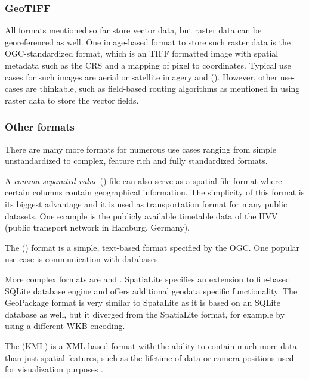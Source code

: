 		\subsubsection{GeoTIFF}
		
			All formats mentioned so far store vector data, but raster data can be georeferenced as well.
			One image-based format to store such raster data is the OGC-standardized  format\cite{ogc-geotiff}, which is an TIFF formatted image with spatial metadata such as the CRS and a mapping of pixel to coordinates.
			Typical use cases for such images are aerial or satellite imagery and  ().
			However, other use-cases are thinkable, such as field-based routing algorithms as mentioned in  using raster data to store the vector fields.
		
		\subsubsection{Other formats}
		\label{subsubsec:other-formats}
		
			There are many more formats for numerous use cases ranging from simple unstandardized to complex, feature rich and fully standardized formats.
			
			A \emph{comma-separated value} () file can also serve as a spatial file format where certain columns contain geographical information.
			The simplicity of this format is its biggest advantage and it is used as transportation format for many public datasets.
			One example is the publicly available timetable data of the HVV (public transport network in Hamburg, Germany)\cite{hvv-fahrplandaten}.
			
			The  () format is a simple, text-based format specified by the OGC\cite[51]{ogc-sfa}.
			One popular use case is communication with databases.
			
			More complex formats are  and .
			SpatiaLite specifies an extension to file-based SQLite database engine and offers additional geodata specific functionality\cite{spatialite-website}.
			The GeoPackage format is very similar to SpataLite as it is based on an SQLite database as well, but it diverged from the SpatiaLite format, for example by using a different WKB encoding\cite{geopackage-faq}.
			
			The  (KML) is a XML-based format with the ability to contain much more data than just spatial features, such as the lifetime of data or camera positions used for visualization purposes \cite{ogc-kml-2.2}.
			
